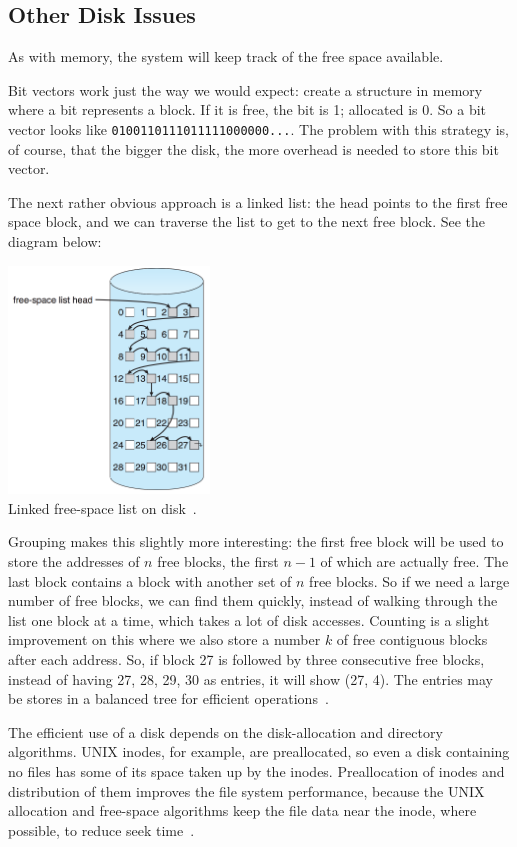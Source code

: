 \subsection*{Other Disk Issues}
As with memory, the system will keep track of the free space available.

Bit vectors work just the way we would expect: create a structure in memory where a bit represents a block. If it is free, the bit is 1; allocated is 0. So a bit vector looks like \texttt{0100110111011111000000...}. The problem with this strategy is, of course, that the bigger the disk, the more overhead is needed to store this bit vector.

The next rather obvious approach is a linked list: the head points to the first free space block, and we can traverse the list to get to the next free block. See the diagram below:

\begin{center}
	\includegraphics[width=0.4\textwidth]{images/disk-linked-list.png}\\
	Linked free-space list on disk~\cite{osc}.
\end{center}

Grouping makes this slightly more interesting: the first free block will be used to store the addresses of $n$ free blocks, the first $n-1$ of which are actually free. The last block contains a block with another set of $n$ free blocks. So if we need a large number of free blocks, we can find them quickly, instead of walking through the list one block at a time, which takes a lot of disk accesses. Counting is a slight improvement on this where we also store a number $k$ of free contiguous blocks after each address. So, if block 27 is followed by three consecutive free blocks, instead of having 27, 28, 29, 30 as entries, it will show (27, 4). The entries may be stores in a balanced tree for efficient operations~\cite{osc}.


The efficient use of a disk depends on the disk-allocation and directory algorithms. UNIX inodes, for example, are preallocated, so even a disk containing no files has some of its space taken up by the inodes. Preallocation of inodes and distribution of them improves the file system performance, because the UNIX allocation and free-space algorithms keep the file data near the inode, where possible, to reduce seek time~\cite{osc}.

